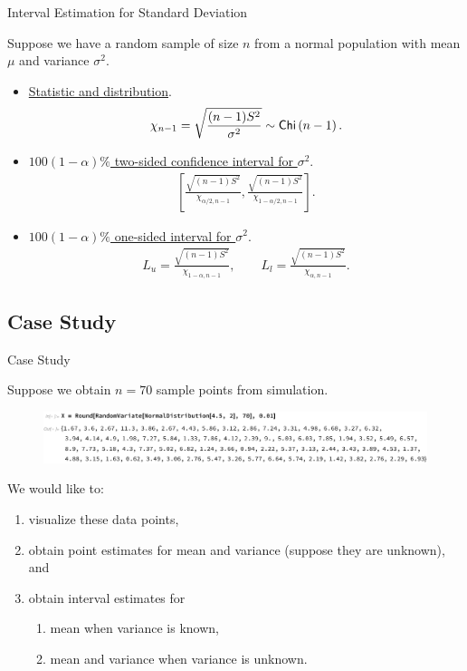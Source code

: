 \begin{frame}{Interval Estimation for Standard Deviation}

\justifying
{} Suppose we have a random sample of size $n$ from a normal population with  mean $\mu$ and  variance $\sigma^2$.
\begin{itemize}
	\item \underline{Statistic and distribution}.
	\begin{align*}
	\chi_{n-1} = \sqrt{\frac{(n-1)S^2}{\sigma^2}} \sim \mathsf{Chi}\left(n-1 \right).
	\end{align*}
	\item \underline{$100(1-\alpha)\%$ two-sided confidence interval for $\sigma^2$}.
	\begin{align*}
	\left[\frac{\sqrt{(n-1)S^2}}{\chi_{\alpha/2, n-1}}, \frac{\sqrt{(n-1)S^2}}{\chi_{1-\alpha/2, n-1}} \right].
	\end{align*}
	\item \underline{$100(1-\alpha)\%$ one-sided interval for $\sigma^2$}.
	\begin{align*}
	L_u = \frac{\sqrt{(n-1)S^2}}{\chi_{1-\alpha, n-1}}, \qquad L_l = \frac{\sqrt{(n-1)S^2}}{\chi_{\alpha, n-1}}.
	\end{align*}
\end{itemize}

\end{frame}


\subsection{Case Study}

\begin{frame}{Case Study}

\justifying
Suppose we obtain $n = 70$ sample points from simulation.
\begin{figure}[htbp]
	\centering
	\includegraphics[width=\linewidth]{./images/rc4fig6.pdf}
\end{figure}
We would like to:
\begin{enumerate}
	\justifying
	\item visualize these data points,
	\item obtain point estimates for mean and variance (suppose they are unknown), and
	\item obtain interval estimates for
	\begin{enumerate}
		\justifying
		\item mean when variance is known,
		\item mean and variance when variance is unknown.
	\end{enumerate}
\end{enumerate}

\end{frame}

